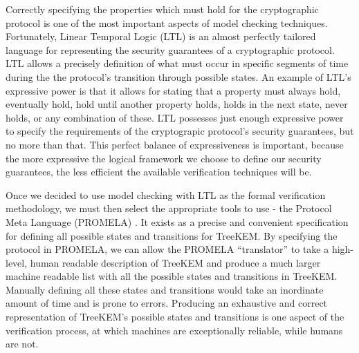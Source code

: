 \documentclass[12pt,twocolumn]{article}
\begin{document}
	Correctly specifying the properties which must hold for the cryptographic protocol is one of the most important aspects of model checking techniques. Fortunately, Linear Temporal Logic (LTL) \cite{4567924} is an almost perfectly tailored language for representing the security guarantees of a cryptographic protocol. LTL allows a precisely definition of what must occur in specific segments of time during the the protocol's transition through possible states. An example of LTL's expressive power is that it allows for stating that a property must always hold, eventually hold, hold until another property holds, holds in the next state, never holds, or any combination of these. LTL possesses just enough expressive power to specify the requirements of the cryptograpic protocol's security guarantees, but no more than that. This perfect balance of expressiveness is important, because the more expressive the logical framework we choose to define our security guarantees, the less efficient the available verification techniques will be.
	
	Once we decided to use model checking with LTL as the formal verification methodology, we must then select the appropriate tools to use - the Protocol Meta Language (PROMELA) \cite{holzmann1990design}. It exists as a precise and convenient specification for defining all possible states and transitions for TreeKEM. By specifying the protocol in PROMELA, we can allow the PROMELA ``translator'' to take a high-level, human readable description of TreeKEM and produce a much larger machine readable list with all the possible states and transitions in TreeKEM. Manually defining all these states and transitions would take an inordinate amount of time and is prone to errors. Producing an exhaustive and correct representation of TreeKEM's possible states and transitions is one aspect of the verification process, at which machines are exceptionally reliable, while humans are not.
	
\end{document}
